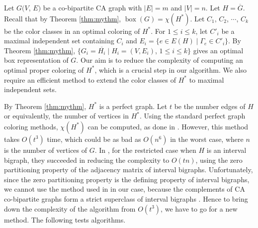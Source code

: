 Let $G(V$, $E)$ be a co-bipartite CA graph with $|E| = m$ and $|V|= n$. Let $H=\overline G$. Recall that by Theorem \ref{thm:mythm}, 
$\operatorname{box}(G)= \chi(H^*)$. Let $C_1$, $C_2$, $\cdots$, $C_k$ be the color classes in an optimal coloring of $H^*$. 
For $1\le i\le k$, let $C'_i$ be a maximal independent set containing $C_i$ and $E_i=\{e \in E(H)  \mid \Gamma_e \in C'_i\}$. 
By Theorem \ref{thm:mythm}, $\{G_i=\overline {H_i} \mid H_i=(V, E_i)$, $1 \le i \le k \}$ gives an optimal box representation of $G$. Our aim is to reduce the complexity of computing an optimal proper coloring of $H^*$, which is a crucial step in our algorithm. We also require an efficient method to extend the color classes of $H^*$ to maximal independent sets. 

By Theorem \ref{thm:mythm}, $H^*$ is a perfect graph. Let $t$ be the number edges of $H$ or equivalently, the number of vertices in $H^*$. Using the standard perfect graph coloring methods, $\chi(H^*)$ can be computed, as done in \cite{Abu10}. However, this method takes $O(t^3)$ time, which could be as bad as $O(n^6)$ in the worst case, where $n$ is the number of vertices of $G$. In \cite{Abu10}, for the restricted case when $H$ is an interval bigraph, they succeeded in reducing the complexity to $O(tn)$, using the zero partitioning property of the adjacency matrix of interval bigraphs. Unfortunately, since the zero partitioning property is the defining property of interval bigraphs, we cannot use the method used in \cite{Abu10} in our case, because the complements of CA co-bipartite graphs form a strict superclass of interval bigraphs \cite{Shrestha10}. Hence to bring down the complexity of the algorithm from $O(t^3)$, we have to go for a new method. 
The following tests algorithms.
